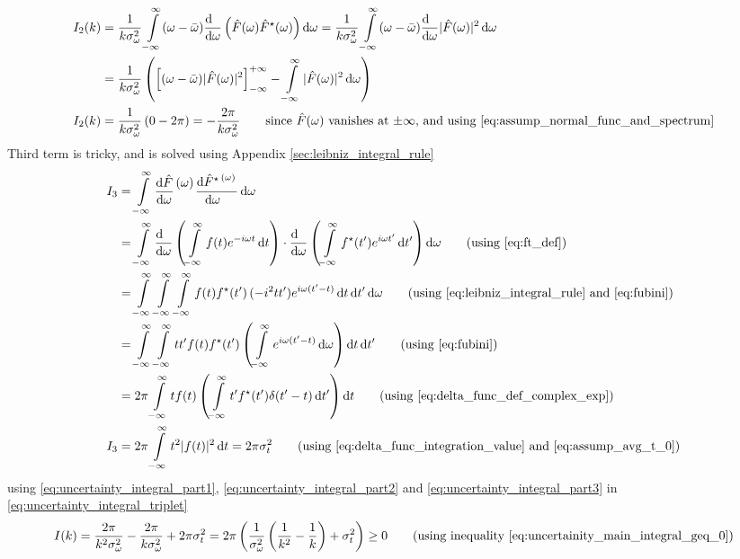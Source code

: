 \documentclass[11pt, a4paper]{article}
\newcommand{\numerator}[1]{\genfrac{}{}{0pt}{}{#1}{}}
\newcommand{\eqrefnp}[1]{\textup{\ref{#1}}}  %
\newcommand{\primed}[1]{#1^{\prime}}
\newcommand{\tp}{\primed{t}}	%
\newcommand{\variance}[1]{\sigma_{#1}^{2}}
\newcommand{\diff}{\mathop{}\!\mathrm{d}}
\newcommand{\dt}{\diff t}
\newcommand{\dtp}{\diff \tp}
\newcommand{\domega}{\diff \omega}
\newcommand{\derv}[1]{\frac{\diff \hfill}{\diff #1}}	%
\newcommand{\dervb}[2]{\derv{#1} \left(#2\right)}  %
\newcommand{\dervf}[2]{\frac{\diff #2}{\diff #1 \hfil}}	%
\newcommand{\dint}[2]{\int \limits_{#1}^{#2}}  %
\newcommand{\intinfty}{\dint{-\infty}{\infty}}	%
\newcommand{\iintinfty}{\intinfty \intinfty}	%
\newcommand{\iiintinfty}{\intinfty \intinfty \intinfty}	%
\begin{document}
	\begin{align}
		I_{2}(k) & = \frac{1}{k \variance{\omega}} \intinfty (\omega - \bar{\omega}) \dervb{\omega}{\hat{F}(\omega) \hat{F}^{\star}(\omega)} \domega = \frac{1}{k \variance{\omega}} \intinfty (\omega - \bar{\omega}) \derv{\omega}|\hat{F}(\omega)|^{2} \domega \nonumber \\
		& = \frac{1}{k \variance{\omega}} \left(\left[(\omega - \bar{\omega})|\hat{F}(\omega)|^{2}\right]_{-\infty}^{+\infty} - \intinfty |\hat{F}(\omega)|^{2} \domega \right) \nonumber \\
		I_{2}(k) & = \frac{1}{k \variance{\omega}} \left(0 - 2\pi \right) = -\frac{2\pi}{k \variance{\omega}} \qquad \text{since $\hat{F}(\omega)$ vanishes at $\pm\infty$, and using \eqref{eq:assump_normal_func_and_spectrum}} \label{eq:uncertainty_integral_part2}
	\end{align}
	Third term is tricky, and is solved using Appendix \ref{sec:leibniz_integral_rule}
	\begin{align}
		I_{3} & = \intinfty \dervf{\omega}{\hat{F}}\numerator{(\omega)} \dervf{\omega}{\hat{F}^{\star}\numerator{(\omega)}} \domega \nonumber \\
		& = \intinfty \dervb{\omega}{\intinfty f(t)e^{-i \omega t} \dt} \cdot \dervb{\omega}{\intinfty f^{\star}(\tp)e^{i \omega \tp} \dtp} \domega \nonumber \tag{using \eqrefnp{eq:ft_def}} \\
		& =  \iiintinfty f(t)f^{\star}(\tp)\,(-i^{2}t \tp)e^{i \omega (\tp - t)} \dt \dtp \domega
		\nonumber \tag{using \eqrefnp{eq:leibniz_integral_rule} and \eqrefnp{eq:fubini}} \\
		& = \iintinfty t \tp f(t)f^{\star}(\tp) \left(\intinfty e^{i \omega (\tp - t)} \domega \right) \dt \dtp \nonumber \tag{using \eqrefnp{eq:fubini}} \\
		& = 2 \pi \intinfty t f(t) \left(\intinfty \tp f^{\star}(\tp) \delta(\tp - t) \dtp \right) \dt  \nonumber \tag{using \eqrefnp{eq:delta_func_def_complex_exp}} \\
		I_{3} & = 2 \pi \intinfty t^{2} |f(t)|^{2} \dt = 2 \pi \variance{t}  \qquad \text{(using \eqrefnp{eq:delta_func_integration_value} and \eqrefnp{eq:assump_avg_t_0})} \label{eq:uncertainty_integral_part3}
	\end{align}
	using \eqref{eq:uncertainty_integral_part1}, \eqref{eq:uncertainty_integral_part2} and \eqref{eq:uncertainty_integral_part3} in \eqref{eq:uncertainty_integral_triplet}
	\begin{equation*}
		I(k) = \frac{2 \pi}{k^{2} \variance{\omega}} - \frac{2 \pi}{k \variance{\omega}} + 2 \pi \variance{t} = 2 \pi \left(\frac{1}{\variance{\omega}}\left( \frac{1}{k^{2}} - \frac{1}{k}\right) + \variance{t} \right) \geq 0 \tag{using inequality \eqrefnp{eq:uncertainity_main_integral_geq_0}}
	\end{equation*}
\end{document}
